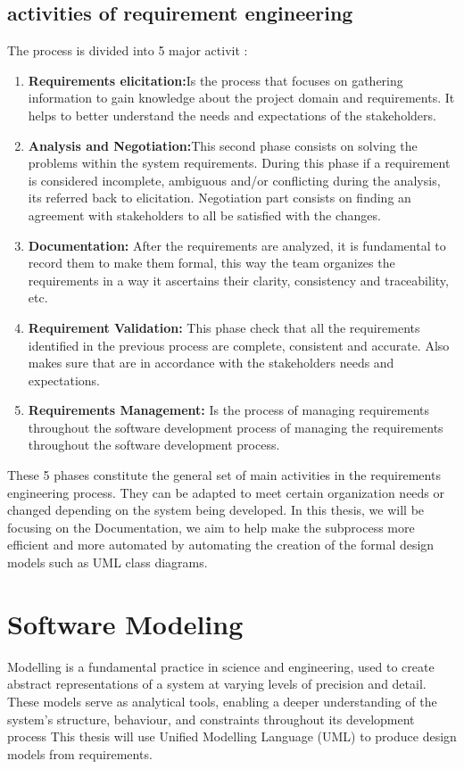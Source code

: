 \subsection{activities of requirement engineering}
The process is divided into 5 major activit \cite{4BSharma2013}:
\begin{enumerate}
    \item \textbf{Requirements elicitation:}Is the process that focuses on gathering information to gain knowledge about the project domain and requirements. It helps to better understand the needs and expectations of the stakeholders.
    \item \textbf{Analysis and Negotiation:}This second phase consists on solving the problems within the system requirements. During this phase if a requirement is considered incomplete, ambiguous and/or conflicting during the analysis, its referred back to elicitation. Negotiation part consists on finding an agreement with stakeholders to all be satisfied with the changes.
    \item \textbf{Documentation:} After the requirements are analyzed, it is fundamental to record them to make them formal, this way the team organizes the requirements in a way it ascertains their clarity, consistency and traceability, etc.
    \item \textbf{Requirement Validation:} This phase check that all the requirements identified in the previous process are complete, consistent and accurate. Also makes sure that are in accordance with the stakeholders needs and expectations.
    \item \textbf{Requirements Management:} Is the process of managing requirements throughout the software development process of managing the requirements throughout the software development process.
\end{enumerate}
These 5 phases constitute the general set of main activities in the requirements engineering process. They can be adapted to meet certain organization needs or changed depending on the system being developed. \cite{1BKotonya1998}
In this thesis, we will be focusing on the Documentation, we aim to help make the subprocess more efficient and more automated by automating the creation of the formal design models such as UML class diagrams. 
\fi
\section{Software Modeling}
\label{sec:software_modeling}

Modelling is a fundamental practice in science and engineering, used to create abstract representations of a system at varying levels of precision and detail. These models serve as analytical tools, enabling a deeper understanding of the system’s structure, behaviour, and constraints throughout its development process  \cite{5BGomaa2011}
This thesis will use Unified Modelling Language (UML) to produce design models from requirements.

